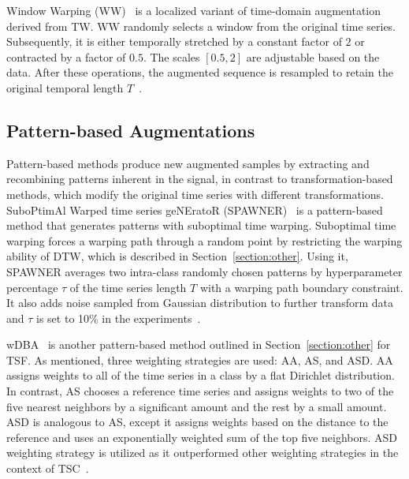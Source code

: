 Window Warping (WW)~\cite{leguennec:halshs-01357973} is a localized variant of time-domain augmentation derived from TW. WW randomly selects a window from the original time series. Subsequently, it is either temporally stretched by a constant factor of $2$ or contracted by a factor of $0.5$. The scales $[0.5, 2]$ are adjustable based on the data. After these operations, the augmented sequence is resampled to retain the original temporal length $T$~\cite{10.1371/journal.pone.0315343}.


\subsection{Pattern-based Augmentations}

Pattern-based methods produce new augmented samples by extracting and recombining patterns inherent in the signal, in contrast to transformation-based methods, which modify the original time series with different transformations. SuboPtimAl Warped time series geNEratoR (SPAWNER)~\cite{s20010098} is a pattern-based method that generates patterns with suboptimal time warping. Suboptimal time warping forces a warping path through a random point by restricting the warping ability of DTW, which is described in Section~\ref{section:other}. Using it, SPAWNER averages two intra-class randomly chosen patterns by hyperparameter percentage $\tau$ of the time series length $T$ with a warping path boundary constraint. It also adds noise sampled from Gaussian distribution to further transform data and $\tau$ is set to 10\% in the experiments~\cite{10.1371/journal.pone.0254841}.


wDBA~\cite{asd} is another pattern-based method outlined in Section~\ref{section:other} for TSF. As mentioned, three weighting strategies are used: AA, AS, and ASD. AA assigns weights to all of the time series in a class by a flat Dirichlet distribution. In contrast, AS chooses a reference time series and assigns weights to two of the five nearest neighbors by a significant amount and the rest by a small amount. ASD is analogous to AS, except it assigns weights based on the distance to the reference and uses an exponentially weighted sum of the top five neighbors. ASD weighting strategy is utilized as it outperformed other weighting strategies in the context of TSC~\cite{asd, 10.1371/journal.pone.0254841}.




